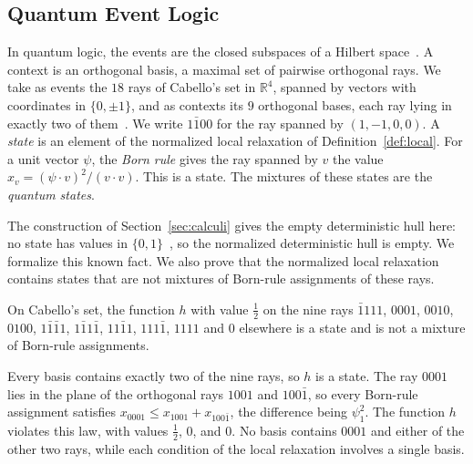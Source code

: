 \subsection{Quantum Event Logic}
\label{sec:quantum}

In quantum logic, the events are the closed subspaces of a Hilbert
space~\cite{birkhoff-vonneumann1936}. A context is an orthogonal
basis, a maximal set of pairwise orthogonal rays. We take as events the
$18$ rays of Cabello's set in $\mathbb{R}^4$, spanned by vectors with
coordinates in $\{0, \pm 1\}$, and as contexts its $9$ orthogonal bases,
each ray lying in exactly two of them~\cite{cabello1996}.
We write $1\bar{1}00$ for the ray spanned by $(1, -1, 0, 0)$. A
\emph{state} is an element of the normalized local relaxation of
Definition~\ref{def:local}. For a unit vector $\psi$, the \emph{Born rule}
gives the ray spanned by $v$ the value $x_v = (\psi \cdot v)^2 / (v \cdot v)$. This is a state. The mixtures of these states are
the \emph{quantum states}.

The construction of Section~\ref{sec:calculi} gives the empty deterministic hull
here: no state has values in
$\{0,1\}$~\cite{kochen-specker1967,cabello1996}, so the normalized deterministic
hull is empty. We formalize this known
fact. We also prove that the
normalized local relaxation contains states that are not mixtures of
Born-rule assignments of these rays.

\begin{theorem}
\label{thm:loc-quantum}
On Cabello's set, the function $h$ with value $\tfrac12$ on the nine rays
$\bar{1}111$, $0001$, $0010$, $0100$, $1\bar{1}\bar{1}1$,
$1\bar{1}1\bar{1}$, $11\bar{1}1$, $111\bar{1}$, $1111$ and $0$ elsewhere is
a state and is not a mixture of Born-rule assignments.
\end{theorem}

\noindent
Every basis contains exactly two of the nine rays, so $h$ is a state. The
ray $0001$ lies in the plane of the orthogonal rays $1001$ and
$100\bar{1}$, so every Born-rule assignment satisfies
$x_{0001} \le x_{1001} + x_{100\bar{1}}$, the difference being
$\psi_1^2$. The function $h$ violates this law, with values $\tfrac12$,
$0$, and $0$. No basis contains $0001$ and either of the other two rays,
while each condition of the local relaxation involves a single basis.

